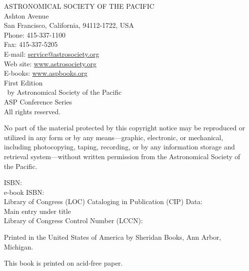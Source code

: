 \null
\setlength{\headheight}{0cm}
\setlength{\headsep}{0cm}
\setlength{\textheight}{8.3in}
\setlength{\footskip}{0cm}
\pagestyle{empty}
\vfill
{\footnotesize
\begin{center}
ASTRONOMICAL SOCIETY OF THE PACIFIC\\
 Ashton Avenue\\
San Francisco, California, 94112-1722, USA\\
\medskip
Phone: 415-337-1100\\
Fax: 415-337-5205\\
E-mail: \url{service@astrosociety.org}\\
Web site: \url{www.astrosociety.org}\\
E-books: \url{www.aspbooks.org}\\
\bigskip
First Edition\\
\raisebox{1.5pt}{\tiny\copyright}\hspace{2pt}\cpryear\ by Astronomical Society of the Pacific\\
ASP Conference Series\\
All rights reserved.\\
\medskip
\end{center}
No part of the material protected by this copyright notice may be
reproduced or utilized in any form or by any means---graphic,
electronic, or mechanical, including photocopying, taping,
recording, or by any information storage and retrieval
system---without written permission from the Astronomical Society of the Pacific.\\
\bigskip
\begin{center}
ISBN:~\ISBN \\
e-book ISBN:~\eISBN \\
\bigskip
Library of Congress (LOC) Cataloging in Publication (CIP) Data:\\
Main entry under title\\
Library of Congress Control Number (LCCN):~\LCCN \\
\end{center}
\begin{center}
Printed in the United States of America by Sheridan Books, Ann Arbor, Michigan.

This book is printed on acid-free paper.
\end{center}
}
